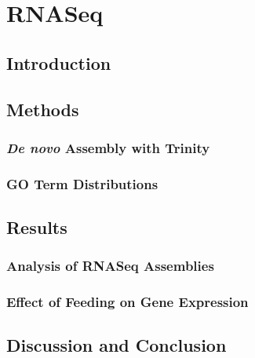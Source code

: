 \section{RNASeq}

\subsection{Introduction}

\subsection{Methods}

\subsubsection{\emph{De novo} Assembly with Trinity}

\subsubsection{GO Term Distributions}

\subsection{Results}

\subsubsection{Analysis of RNASeq Assemblies}

\subsubsection{Effect of Feeding on Gene Expression}

\subsection{Discussion and Conclusion}